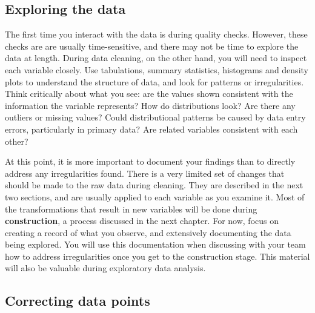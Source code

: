 \subsection{Exploring the data}

The first time you interact with the data is during quality checks.
However, these checks are are usually time-sensitive,
and there may not be time to explore the data at length.
During data cleaning, on the other hand,
you will need to inspect each variable closely.
Use tabulations, summary statistics, histograms and density plots to understand the structure of data,
and look for patterns or irregularities.
Think critically about what you see:
are the values shown consistent with the information the variable represents?
How do distributions look?
Are there any outliers or missing values?
Could distributional patterns be caused by data entry errors,
particularly in primary data?
Are related variables consistent with each other?

At this point, it is more important to document your findings
than to directly address any irregularities found.
There is a very limited set of changes that should be made to the raw data during cleaning.
They are described in the next two sections,
and are usually applied to each variable as you examine it.
Most of the transformations that result in new variables
will be done during \textbf{construction}, a process discussed in the next chapter.
For now, focus on creating a record of what you observe,
and extensively documenting the data being explored.
You will use this documentation when discussing with your team
how to address irregularities once you get to the construction stage.
This material will also be valuable during exploratory data analysis.

\subsection{Correcting data points}

